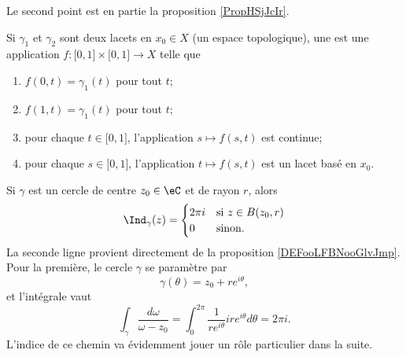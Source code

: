 Le second point est en partie la proposition \ref{PropHSjJcIr}.

\begin{definition}  \label{DefECnFJQp}
    Si \( \gamma_1\) et \( \gamma_2\) sont deux lacets en \( x_0\in X\) (un espace topologique), une  est une application \( f\colon \mathopen[ 0 , 1 \mathclose]\times \mathopen[ 0 , 1 \mathclose]\to X\) telle que
    \begin{enumerate}
        \item
            \( f(0,t)=\gamma_1(t)\) pour tout \( t\);
        \item
            \( f(1,t)=\gamma_1(t)\) pour tout \( t\);
        \item
            pour chaque \( t\in \mathopen[ 0 , 1 \mathclose]\), l'application \( s\mapsto f(s,t)\) est continue;
        \item
            pour chaque \( s\in \mathopen[ 0 , 1 \mathclose]\), l'application \( t\mapsto f(s,t)\) est un lacet basé en \( x_0\).
    \end{enumerate}
\end{definition}

\begin{example} \label{ExradygL}
    Si \( \gamma\) est un cercle de centre \( z_0\in \eC\) et de rayon \( r\), alors 
    \begin{equation}
        \Ind_{\gamma}(z)=\begin{cases}
            2\pi i    &   \text{si } z\in B(z_0,r)\\
            0    &    \text{sinon}.
        \end{cases}
    \end{equation}
    La seconde ligne provient directement de la proposition \ref{DEFooLFBNooGlvJmp}. Pour la première, le cercle \( \gamma\) se paramètre par
    \begin{equation}
        \gamma(\theta)=z_0+r e^{i\theta},
    \end{equation}
    et l'intégrale vaut
    \begin{equation}
        \int_{\gamma}\frac{ d\omega }{ \omega-z_0 }=\int_0^{2\pi}\frac{1}{ r e^{i\theta} }ir e^{i\theta}d\theta=2\pi i.
    \end{equation}
    L'indice de ce chemin va évidemment jouer un rôle particulier dans la suite.
\end{example}

